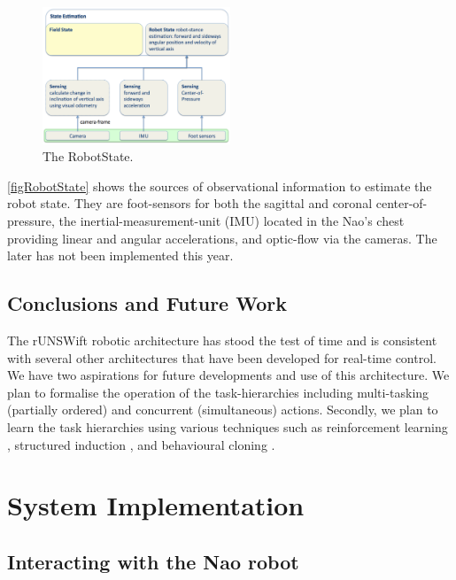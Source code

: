 \documentclass[pdftex,11pt,a4paper]{report}
\begin{document}
\begin{figure}[!htp]
\centering
\includegraphics[width=0.5\textwidth]{figures/RobotState}
\caption{The RobotState.} \label{figRobotState}
\end{figure}

\autoref{figRobotState} shows the sources of observational information to estimate the robot state. They are foot-sensors for both the sagittal and coronal center-of-pressure, the inertial-measurement-unit (IMU) located in the Nao's chest providing linear and angular accelerations, and optic-flow via the cameras. The later has not been implemented this year.

\section{Conclusions and Future Work}
The rUNSWift robotic architecture has stood the test of time and is consistent with several other architectures that have been developed for real-time control. We have two aspirations for future developments and use of this architecture. We plan to formalise the operation of the task-hierarchies including multi-tasking (partially ordered) and concurrent (simultaneous) actions. Secondly, we plan to learn the task hierarchies using various techniques such as reinforcement learning \cite{sutton98reinforcement}, structured induction \cite{shapiro87structured}, and behavioural cloning \cite{Bain96aframework}. 

\newpage
\chapter{System Implementation}

\section{Interacting with the Nao robot}
\end{document}
